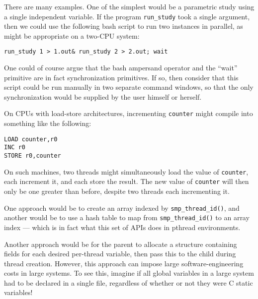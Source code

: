 	   There are many examples.
	   One of the simplest would be a parametric study using a
	   single independent variable.
	   If the program {\tt run\_study} took a single argument,
	   then we could use the following bash script to run two
	   instances in parallel, as might be appropriate on a
	   two-CPU system:

	   { \scriptsize \tt run\_study 1 > 1.out\& run\_study 2 > 2.out; wait}

	   One could of course argue that the bash ampersand operator and
	   the ``wait'' primitive are in fact synchronization primitives.
	   If so, then consider that 
	   this script could be run manually in two separate
	   command windows, so that the only synchronization would be
	   supplied by the user himself or herself.


	On CPUs with load-store architectures, incrementing {\tt counter}
	might compile into something like the following:

\vspace{5pt}
\begin{minipage}[t]{\columnwidth}
\small 
\begin{verbatim}
LOAD counter,r0
INC r0
STORE r0,counter
\end{verbatim}
\end{minipage} 
\vspace{5pt}

	On such machines, two threads might simultaneously load the
	value of {\tt counter}, each increment it, and each store the
	result.
	The new value of {\tt counter} will then only be one greater
	than before, despite two threads each incrementing it.


	One approach would be to create an array indexed by
	{\tt smp\_thread\_id()}, and another would be to use a hash
	table to map from {\tt smp\_thread\_id()} to an array
	index --- which is in fact what this
	set of APIs does in pthread environments.

	Another approach would be for the parent to allocate a structure
	containing fields for each desired per-thread variable, then
	pass this to the child during thread creation.
	However, this approach can impose large software-engineering
	costs in large systems.
	To see this, imagine if all global variables in a large system
	had to be declared in a single file, regardless of whether or
	not they were C static variables!

